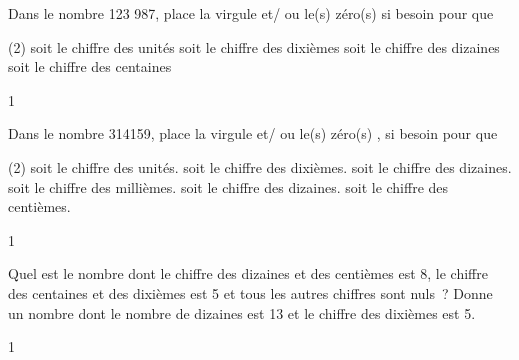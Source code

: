 \documentclass[a4paper,11pt]{report}
\begin{document}
\begin{exo}{
Dans le nombre 123 987, place la virgule  et/ ou le(s) zéro(s) si besoin pour que
\begin{tasks}[after-skip=-0.7em,before-skip=-0.7em, after-item-skip=0.18em](2)
 soit le chiffre des unités  
 soit le chiffre des dixièmes  
 soit le chiffre des dizaines 
 soit le chiffre des centaines 
\end{tasks}

}{1}\end{exo}



\begin{exo}{
Dans le nombre 314159, place la virgule  et/ ou le(s) zéro(s) , si besoin pour que
\begin{tasks}[after-skip=-0.7em,before-skip=-0.7em, after-item-skip=0.18em](2)
 soit le chiffre des unités.  
 soit le chiffre des dixièmes. 
 soit le chiffre des dizaines. 
 soit le chiffre des millièmes. 
 soit le chiffre des dizaines.
 soit le chiffre des centièmes.
\end{tasks}

}{1}\end{exo}

\begin{exo}{
\begin{tasks}[before-skip=-0.7em, after-item-skip=0.18em]
\task Quel est le nombre dont le chiffre des dizaines et des centièmes est 8, le chiffre des centaines et des dixièmes est 5 et tous les autres chiffres sont nuls~?
\task Donne un nombre dont le nombre de dizaines est 13 et le chiffre des dixièmes est 5.
\end{tasks}
}{1}\end{exo}


\newpage
\end{document}
